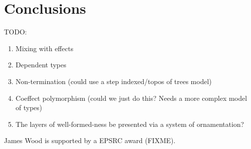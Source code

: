 \documentclass[sigplan,review]{acmart}\settopmatter{printfolios=true,printccs=false,printacmref=false}
\begin{document}
\section{Conclusions}

TODO:
\begin{enumerate}
\item Mixing with effects
\item Dependent types
\item Non-termination (could use a step indexed/topos of trees model)
\item Coeffect polymorphism (could we just do this? Needs a more
  complex model of types)
\item The layers of well-formed-ness be presented via a system of
  ornamentation?
\end{enumerate}

\begin{acks}                            %
  James Wood is supported by a EPSRC award (FIXME).
\end{acks}


%



\end{document}
